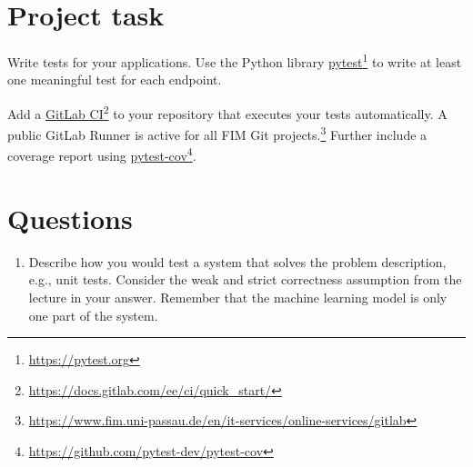 

\newcommand{\dozenten}{Prof.~Dr.~Steffen Herbold}
\newcommand{\vorlesung}{Principles of AI Engineering}
\newcommand{\docauthor}{Lukas Schulte}
\newcommand{\semester}{}
\newcommand{\blattnummer}{6}
\newcommand{\bistermin}{}



\section*{Project task}

Write tests for your applications. Use the Python library \href{https://pytest.org}{pytest}\footnote{\url{https://pytest.org}} to write at least one meaningful test for each endpoint.

\vspace{5px}

Add a \href{https://docs.gitlab.com/ee/ci/quick_start/}{GitLab CI}\footnote{\url{https://docs.gitlab.com/ee/ci/quick_start/}} to your repository that executes your tests automatically. A public GitLab Runner is active for all FIM Git projects.\footnote{\url{https://www.fim.uni-passau.de/en/it-services/online-services/gitlab}} Further include a coverage report using \href{https://github.com/pytest-dev/pytest-cov}{pytest-cov}\footnote{\url{https://github.com/pytest-dev/pytest-cov}}.

\section*{Questions}

\begin{enumerate}
      \item
            Describe how you would test a system that solves the problem description, e.g., unit tests. Consider the weak and strict correctness assumption from the lecture in your answer. Remember that the machine learning model is only one part of the system.
\end{enumerate}


